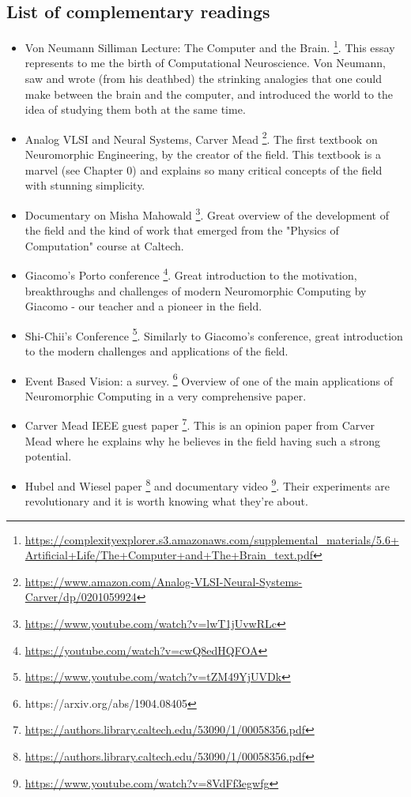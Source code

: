 \subsection{List of complementary readings}
\begin{itemize}
    \item Von Neumann Silliman Lecture: The Computer and the Brain. \footnote{\url{https://complexityexplorer.s3.amazonaws.com/supplemental_materials/5.6+Artificial+Life/The+Computer+and+The+Brain_text.pdf}}. This essay represents to me the birth of Computational Neuroscience. Von Neumann, saw and wrote (from his deathbed) the strinking analogies that one could make between the brain and the computer, and introduced the world to the idea of studying them both at the same time. 
    \item Analog VLSI and Neural Systems, Carver Mead \footnote{\url{https://www.amazon.com/Analog-VLSI-Neural-Systems-Carver/dp/0201059924}}. The first textbook on Neuromorphic Engineering, by the creator of the field. This textbook is a marvel (see Chapter 0) and explains so many critical concepts of the field with stunning simplicity. 
    \item Documentary on Misha Mahowald \footnote{\url{https://www.youtube.com/watch?v=lwT1jUvwRLc}}. Great overview of the development of the field and the kind of work that emerged from the "Physics of Computation" course at Caltech. 
    \item Giacomo's Porto conference \footnote{\url{https://youtube.com/watch?v=cwQ8edHQFOA}}. Great introduction to the motivation, breakthroughs and challenges of modern Neuromorphic Computing by Giacomo - our teacher and a pioneer in the field. 
    \item Shi-Chii's Conference \footnote{\url{https://www.youtube.com/watch?v=tZM49YjUVDk}}. Similarly to Giacomo's conference, great introduction to the modern challenges and applications of the field. 
    \item Event Based Vision: a survey. \footnote{https://arxiv.org/abs/1904.08405} Overview of one of the main applications of Neuromorphic Computing in a very comprehensive paper. 
    \item Carver Mead IEEE guest paper \footnote{\url{https://authors.library.caltech.edu/53090/1/00058356.pdf}}. This is an opinion paper from Carver Mead where he explains why he believes in the field having such a strong potential. 
    \item Hubel and Wiesel paper \footnote{\url{https://authors.library.caltech.edu/53090/1/00058356.pdf}} and documentary video \footnote{\url{https://www.youtube.com/watch?v=8VdFf3egwfg}}. Their experiments are revolutionary and it is worth knowing what they're about. 
\end{itemize}